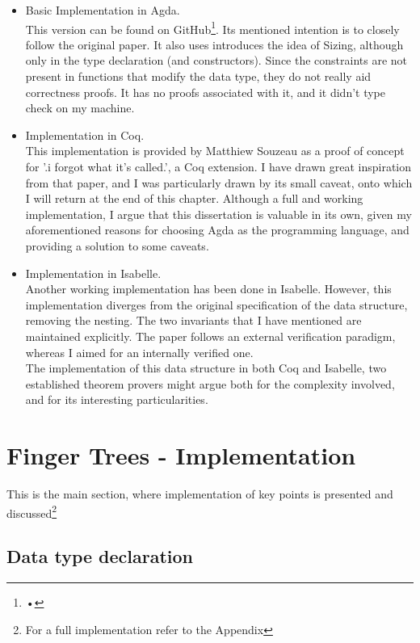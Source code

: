 \documentclass[12pt,twoside,notitlepage]{report}
\begin{document}
\begin{itemize}
\item Basic Implementation in Agda. \\
This version can be found on GitHub\footnote{•}. Its mentioned intention is to closely follow the original paper. It also uses introduces the idea of Sizing, although only in the type declaration (and constructors). Since the constraints are not present in functions that modify the data type, they do not really aid correctness proofs. It has no proofs associated with it, and it didn't type check on my machine.
\item Implementation in Coq. \\
This implementation is provided by Matthiew Souzeau\cite{coq} as a proof of concept for '.i forgot what it's called.', a Coq extension. I have drawn great inspiration from that paper, and I was particularly drawn by its small caveat, onto which I will return at the end of this chapter. Although a full and working implementation, I argue that this dissertation is valuable in its own, given my aforementioned reasons for choosing Agda as the programming language, and providing a solution to some caveats.
\item Implementation in Isabelle. \\
Another working implementation has been done in Isabelle. However, this implementation diverges from the original specification of the data structure, removing the nesting. The two invariants that I have mentioned are maintained explicitly. The paper follows an external verification paradigm, whereas I aimed for an internally verified one.\\ 
The implementation of this data structure in both Coq and Isabelle, two established theorem provers might argue both for the complexity involved, and for its interesting particularities.
\end{itemize}

\section{Finger Trees - Implementation}

This is the main section, where implementation of key points is presented and discussed\footnote{For a full implementation refer to the Appendix}


\subsection{Data type declaration} 
\end{document}
